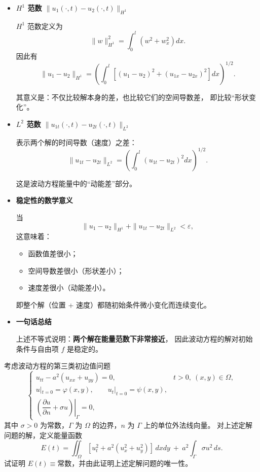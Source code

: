 \begin{solution}
\begin{note}[波动方程稳定性不等式的含义]
\begin{itemize}
  表示两个不同初始条件（或不同外力）所得到的解在时刻 $t$ 的差。
  其中符号 “$\cdot$” 代表空间变量（如 $x$）未写出，例如
  \[
  u_i(\cdot,t)=u_i(x,t).
  \]

  \item \textbf{$H^1$ 范数 $\|u_1(\cdot,t)-u_2(\cdot,t)\|_{H^1}$}

  $H^1$ 范数定义为
  \[
  \|w\|_{H^1}^2
  =\int_0^l \left(w^2 + w_x^2\right) dx.
  \]
  因此有
  \[
  \|u_1-u_2\|_{H^1}
  =
  \left(
  \int_0^l \left[(u_1-u_2)^2 + (u_{1x}-u_{2x})^2\right]dx
  \right)^{1/2}.
  \]

  其意义是：不仅比较解本身的差，也比较它们的空间导数差，
  即比较“形状变化”。

  \item \textbf{$L^2$ 范数 $\|u_{1t}(\cdot,t)-u_{2t}(\cdot,t)\|_{L^2}$}

  表示两个解的时间导数（速度）之差：
  \[
  \|u_{1t}-u_{2t}\|_{L^2}
  =\left(
  \int_0^l (u_{1t}-u_{2t})^2 dx
  \right)^{1/2}.
  \]

  这是波动方程能量中的“动能差”部分。

  \item \textbf{稳定性的数学意义}

  当
  \[
  \|u_1-u_2\|_{H^1}
  +\|u_{1t}-u_{2t}\|_{L^2} < \varepsilon,
  \]
  这意味着：

  \begin{itemize}
    \item 函数值差很小；
    \item 空间导数差很小（形状差小）；
    \item 速度差很小（动能差小）。
  \end{itemize}

  即整个解（位置 + 速度）都随初始条件微小变化而连续变化。

  \item \textbf{一句话总结}

  上述不等式说明：\textbf{两个解在能量范数下非常接近}，
  因此波动方程的解对初始条件与自由项 $f$ 是稳定的。
\end{itemize}

\end{note}
\end{solution}
\begin{homework}[5]
考虑波动方程的第三类初边值问题
\[
\begin{cases}
u_{tt}-a^{2}(u_{xx}+u_{yy})=0, & t>0,\ (x,y)\in\Omega,\\[4pt]
u|_{t=0}=\varphi(x,y),\qquad u_t|_{t=0}=\psi(x,y),\\[4pt]
\left.\left(\dfrac{\partial u}{\partial n}+\sigma u\right)\right|_{\Gamma}=0,
\end{cases}
\]
其中 $\sigma>0$ 为常数，$\Gamma$ 为 $\Omega$ 的边界，$n$ 为 $\Gamma$ 上的单位外法线向量。
对上述定解问题的解，定义能量函数
\[
E(t)=\iint_{\Omega}[u_t^2 + a^{2}(u_x^2+u_y^2)]\,dxdy
\ +\ a^{2}\int_{\Gamma}\sigma u^{2}\,ds.
\]
试证明 $E(t)\equiv\text{常数}$，并由此证明上述定解问题的唯一性。
\end{homework}
